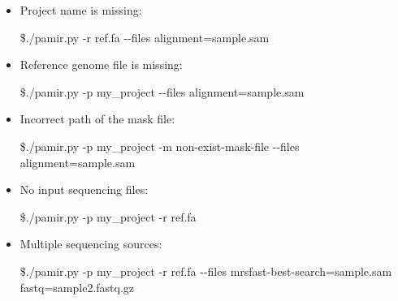 \documentclass{article}
\begin{document}
\begin{itemize}
\item Project name is missing:
\begin{flushleft}
\$./pamir.py -r ref.fa -{}-files alignment=sample.sam
\end{flushleft}

\item  Reference genome file is missing:
\begin{flushleft}
\$./pamir.py -p my\_project -{}-files alignment=sample.sam
\end{flushleft}

\item Incorrect path of the mask file:
\begin{flushleft}
\$./pamir.py -p my\_project -m non-exist-mask-file -{}-files alignment=sample.sam
\end{flushleft}

\item No input sequencing files:
\begin{flushleft}
\$./pamir.py -p my\_project -r ref.fa
\end{flushleft}

\item Multiple sequencing sources:
\begin{flushleft}
\$./pamir.py -p my\_project  -r ref.fa -{}-files mrsfast-best-search=sample.sam fastq=sample2.fastq.gz
\end{flushleft}

\end{itemize}





\end{document}
